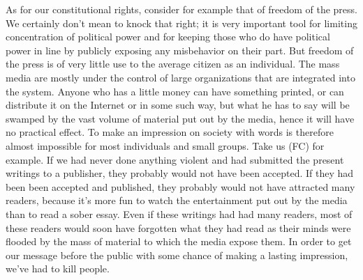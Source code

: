  As for our constitutional rights, consider for example that of freedom of the press. We certainly don’t mean to knock that right; it is very important tool for limiting concentration of political power and for keeping those who do have political power in line by publicly exposing any misbehavior on their part. But freedom of the press is of very little use to the average citizen as an individual. The mass media are mostly under the control of large organizations that are integrated into the system. Anyone who has a little money can have something printed, or can distribute it on the Internet or in some such way, but what he has to say will be swamped by the vast volume of material put out by the media, hence it will have no practical effect. To make an impression on society with words is therefore almost impossible for most individuals and small groups. Take us (FC) for example. If we had never done anything violent and had submitted the present writings to a publisher, they probably would not have been accepted. If they had been been accepted and published, they probably would not have attracted many readers, because it’s more fun to watch the entertainment put out by the media than to read a sober essay. Even if these writings had had many readers, most of these readers would soon have forgotten what they had read as their minds were flooded by the mass of material to which the media expose them. In order to get our message before the public with some chance of making a lasting impression, we’ve had to kill people.
